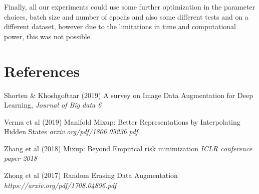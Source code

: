 \documentclass{article}
\begin{document}
Finally, all our experiments could use some further optimization in the parameter choices, batch size and number of epochs and also some different tests and on a different dataset, however due to the limitations 
in time and computational power, this was not possible. 

\section*{References}

Shorten \& Khoshgoftaar (2019) A survey on Image Data Augmentation for Deep Learning, \textit{Journal of Big data 6}

Verma et al (2019) Manifold Mixup: Better Representations by Interpolating Hidden States \textit{arxiv.org/pdf/1806.05236.pdf}

Zhang et al (2018) Mixup: Beyond Empirical risk minimization \textit{ICLR conference paper 2018}

Zhong et al (2017) Random Erasing Data Augmentation \textit{https://arxiv.org/pdf/1708.04896.pdf}
\end{document}
